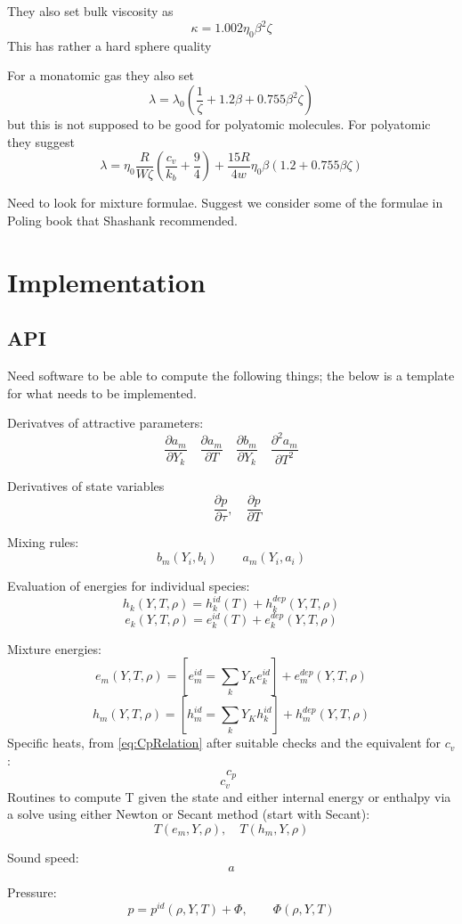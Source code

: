 \documentclass[11pt]{article}
\begin{document}
They also set bulk viscosity as
\[
\kappa = 1.002 \eta_0 \beta^2 \zeta
\]
This has rather a hard sphere quality

For a monatomic gas they also set
\[
\lambda = \lambda_0 (\frac{1}{\zeta} + 1.2 \beta + 0.755 \beta^2 \zeta)
\]
but this is not supposed to be good for polyatomic molecules.
For polyatomic they suggest
\[
\lambda = \eta_0 \frac{R}{W \zeta} \left(\frac{c_v}{k_b} + \frac{9}{4} \right)
+ \frac{15 R}{4 w} \eta_0 \beta \left( 1.2 + 0.755 \beta \zeta \right ) 
\]

Need to look for mixture formulae.  Suggest we consider some of the formulae in Poling book that Shashank
recommended.

    \section{Implementation}
    \subsection{API}
    \label{sec:api}
Need software to be able to compute the following things; the below is a template for what needs to be implemented. 

Derivatves of attractive parameters:
\[
\frac{\partial a_m}{\partial Y_k} \quad \frac{\partial a_m}{\partial T} \quad \frac{\partial b_m}{\partial Y_k} \quad \frac{\partial^2 a_m}{\partial T^2}
\]

Derivatives of state variables
\[
\quad \frac{\partial p}{\partial \tau}, \quad \frac{\partial p}{\partial T}
\]

Mixing rules:
\[
b_m(Y_i,b_i) \qquad a_m(Y_i,a_i)
\]

Evaluation of energies for individual species:
\[
\label{eq:hk}
h_k(Y, T, \rho) = h_k^{id}(T) + h_k^{dep}(Y,T,\rho)
\]
\[
\label{eq:ek}
e_k(Y, T, \rho) = e_k^{id}(T) + e_k^{dep}(Y,T,\rho)
\]

Mixture energies:
\[
e_m(Y, T, \rho) = \left[e_m^{id} = \sum_k Y_Ke_k^{id}\right] + e_m^{dep}(Y,T,\rho)
\]
\[
h_m(Y, T, \rho) = \left[h_m^{id} = \sum_k Y_Kh_k^{id}\right] + h_m^{dep}(Y,T,\rho)
\]
Specific heats, from \ref{eq:CpRelation} after suitable checks and the equivalent for $c_v$:
\[
c_p 
\]
\[
c_v \quad 
\]
Routines to compute T given the state and either internal energy or enthalpy via a solve using either Newton or Secant method (start with Secant):
\[
T(e_m,Y,\rho), \quad T(h_m,Y,\rho)
\]

Sound speed:
\[
a
\]

Pressure:
\[
p = p^{id}(\rho, Y, T) + \Phi,  \qquad \Phi(\rho, Y, T)
\]
\end{document}
